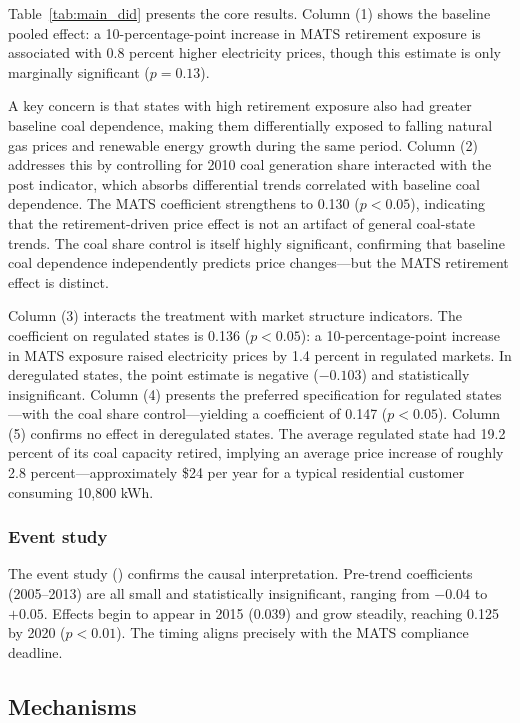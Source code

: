 \documentclass[12pt]{article}
\begin{document}
Table~\ref{tab:main_did} presents the core results. Column (1) shows the baseline pooled effect: a 10-percentage-point increase in MATS retirement exposure is associated with 0.8 percent higher electricity prices, though this estimate is only marginally significant ($p = 0.13$).

A key concern is that states with high retirement exposure also had greater baseline coal dependence, making them differentially exposed to falling natural gas prices and renewable energy growth during the same period. Column (2) addresses this by controlling for 2010 coal generation share interacted with the post indicator, which absorbs differential trends correlated with baseline coal dependence. The MATS coefficient strengthens to 0.130 ($p < 0.05$), indicating that the retirement-driven price effect is not an artifact of general coal-state trends. The coal share control is itself highly significant, confirming that baseline coal dependence independently predicts price changes---but the MATS retirement effect is distinct.

Column (3) interacts the treatment with market structure indicators. The coefficient on regulated states is 0.136 ($p < 0.05$): a 10-percentage-point increase in MATS exposure raised electricity prices by 1.4 percent in regulated markets. In deregulated states, the point estimate is negative ($-0.103$) and statistically insignificant. Column (4) presents the preferred specification for regulated states---with the coal share control---yielding a coefficient of 0.147 ($p < 0.05$). Column (5) confirms no effect in deregulated states. The average regulated state had 19.2 percent of its coal capacity retired, implying an average price increase of roughly 2.8 percent---approximately \$24 per year for a typical residential customer consuming 10,800 kWh.

\subsubsection*{Event study} The event study () confirms the causal interpretation. Pre-trend coefficients (2005--2013) are all small and statistically insignificant, ranging from $-0.04$ to $+0.05$. Effects begin to appear in 2015 (0.039) and grow steadily, reaching 0.125 by 2020 ($p < 0.01$). The timing aligns precisely with the MATS compliance deadline.

\subsection{Mechanisms}
\end{document}
